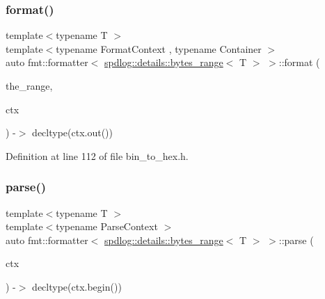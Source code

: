 \subsubsection{\texorpdfstring{format()}{format()}}
{\footnotesize\ttfamily template$<$typename T $>$ \\
template$<$typename Format\+Context , typename Container $>$ \\
auto fmt\+::formatter$<$ \hyperlink{classspdlog_1_1details_1_1bytes__range}{spdlog\+::details\+::bytes\+\_\+range}$<$ T $>$ $>$\+::format (\begin{DoxyParamCaption}\item[{const \hyperlink{classspdlog_1_1details_1_1bytes__range}{spdlog\+::details\+::bytes\+\_\+range}$<$ Container $>$ \&}]{the\+\_\+range,  }\item[{Format\+Context \&}]{ctx }\end{DoxyParamCaption}) -\/$>$ decltype(ctx.\+out())
    \hspace{0.3cm}{\ttfamily [inline]}}



Definition at line 112 of file bin\+\_\+to\+\_\+hex.\+h.

\mbox{\label{structfmt_1_1formatter_3_01spdlog_1_1details_1_1bytes__range_3_01_t_01_4_01_4_ada366ec2d0f00fa94560551fdbbbb640}} 
\subsubsection{\texorpdfstring{parse()}{parse()}}
{\footnotesize\ttfamily template$<$typename T $>$ \\
template$<$typename Parse\+Context $>$ \\
auto fmt\+::formatter$<$ \hyperlink{classspdlog_1_1details_1_1bytes__range}{spdlog\+::details\+::bytes\+\_\+range}$<$ T $>$ $>$\+::parse (\begin{DoxyParamCaption}\item[{Parse\+Context \&}]{ctx }\end{DoxyParamCaption}) -\/$>$ decltype(ctx.\+begin())
    \hspace{0.3cm}{\ttfamily [inline]}}




